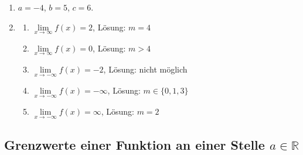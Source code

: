 \begin{enumerate}
          \begin{enumerate}
              \item $\lim\limits_{x \to \infty} \frac{2x^6 - 3x^5 + 7x^3 + 4x - 8}{5x^6 + 8x^5 - 9x^4 + 11x^2} = \frac{2}{5}$, $\lim\limits_{x \to -\infty} \frac{2x^6 - 3x^5 + 7x^3 + 4x - 8}{5x^6 + 8x^5 - 9x^4 + 11x^2} = \frac{2}{5}$
              \item $\lim\limits_{x \to \infty} \frac{10x^8 - 4x^7 + 12}{x^9 + 3x^6 + 4} = 0$, $\lim\limits_{x \to -\infty} \frac{10x^8 - 4x^7 + 12}{x^9 + 3x^6 + 4} = 0$
              \item   $\lim\limits_{x \to \infty} \frac{10x^8 - 4x^7 + 12}{x^7 + 3x^6 + 4} = \infty$, \quad $\lim\limits_{x \to -\infty} \frac{10x^8 - 4x^7 + 12}{x^7+ 3x^6 + 4}=- \infty$
              \item   $\lim\limits_{x \to \infty} \frac{10x^8 - 4x^7 + 12}{ 3x^6 + 4}= \infty$, \quad $\lim\limits_{x \to -\infty} \frac{10x^8 - 4x^7 + 12}{3x^6 + 4}= \infty$
              \item $\lim\limits_{x \to \infty} \frac{\sqrt{x + 1}}{x - 1} = 0$, $\lim\limits_{x \to -\infty} \frac{\sqrt{x + 1}}{x - 1}$ gibt es nicht
              \item $\lim\limits_{x \to \infty} \frac{x^9 + x^4}{e^x} = 0$, $\lim\limits_{x \to -\infty} \frac{x^9 + x^4}{e^x} = -\infty$
          \end{enumerate}

    \item $a = -4$, $b = 5$, $c = 6$.

    \item    \begin{enumerate}
              \item $\lim\limits_{x \to \infty} f(x) = 2$, Lösung: $m = 4$
              \item $\lim\limits_{x \to \infty} f(x) = 0$, Lösung:  $m>4$
              \item $\lim\limits_{x \to -\infty} f(x) = -2$, Lösung: nicht möglich
              \item $\lim\limits_{x \to -\infty} f(x) = -\infty$, Lösung: $m\in \{0, 1, 3\}$
              \item $\lim\limits_{x \to -\infty} f(x) = \infty$, Lösung: $m =2$
          \end{enumerate}

\end{enumerate}

\clearpage
\subsection{Grenzwerte einer Funktion an einer Stelle $a\in \mathbb{R}$}
